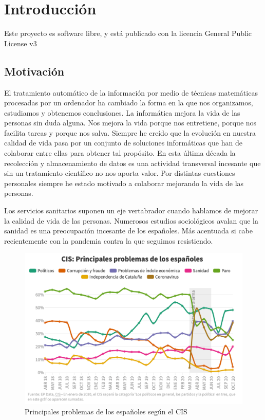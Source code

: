 \chapter{Introducción}
Este proyecto es software libre, y está publicado con la licencia \cite{gplv3} General Public License v3

\section{Motivación} 
El tratamiento automático de la información por medio de técnicas matemáticas procesadas por un ordenador 
ha cambiado la forma en la que nos organizamos, estudiamos y obtenemos conclusiones. La informática mejora 
la vida de las personas sin duda alguna. Nos mejora la vida porque nos entretiene, porque nos facilita 
tareas y porque nos salva. Siempre he creído que la evolución en nuestra calidad de vida pasa por un 
conjunto de soluciones informáticas que han de colaborar entre ellas para obtener tal propósito. 
En esta última década la recolección y almacenamiento de datos es una actividad transversal incesante 
que sin un tratamiento científico no nos aporta valor. Por distintas cuestiones personales siempre he 
estado motivado a colaborar mejorando la vida de las personas. 

Los servicios sanitarios suponen un eje vertabrador cuando hablamos de mejorar la calidad 
de vida de las personas. Numerosos estudios sociológicos avalan que la sanidad es una 
preocupación incesante de los españoles. Más acentuada si cabe recientemente con la 
pandemia contra la que seguimos resistiendo.

\begin{figure}[]
	\centering	
	\includegraphics[scale=0.5]{logos/imgs/CIS_1.png}
	\caption{ \cite{rtve-cis}  Principales problemas de los españoles según el CIS }
    \label{fig:worst_f_value}
\end{figure}

